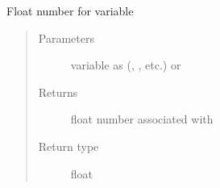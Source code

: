 \documentclass[letterpaper,10pt,english]{sphinxmanual}
\begin{document}
\begin{fulllineitems}
\label{\detokenize{diffsph.utils:diffsph.utils.tools.delta_float}}
\sphinxAtStartPar
Float number for variable 
\begin{quote}\begin{description}
\item[{Parameters}] \leavevmode
\sphinxAtStartPar
{} \textendash{} variable  as  (, , etc.) or 

\item[{Returns}] \leavevmode
\sphinxAtStartPar
float number associated with 

\item[{Return type}] \leavevmode
\sphinxAtStartPar
float

\end{description}\end{quote}

\end{fulllineitems}


\begin{fulllineitems}
\label{\detokenize{diffsph.utils:diffsph.utils.tools.df}}
\end{fulllineitems}

\end{document}

